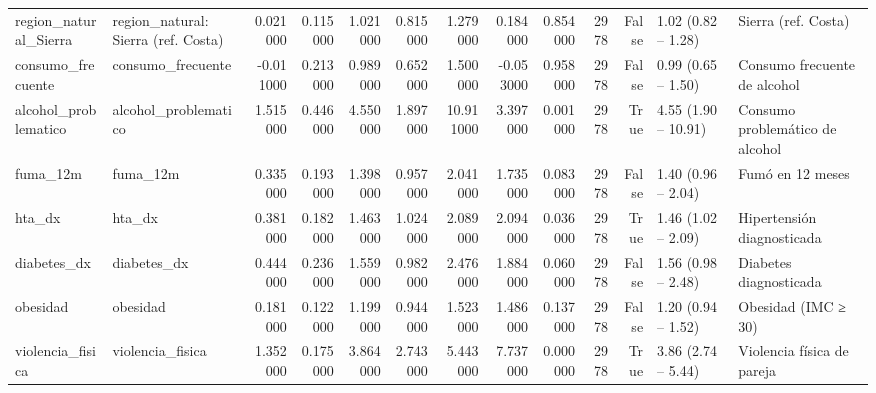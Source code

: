 \begin{table}[htbp]
\begin{tabular}{llrrrrrrrrrll}
region\_natural\_Sierra & region\_natural: Sierra (ref. Costa) & 0.021000 & 0.115000 & 1.021000 & 0.815000 & 1.279000 & 0.184000 & 0.854000 & 2978 & False & 1.02 (0.82 – 1.28) & Sierra (ref. Costa) \\
consumo\_frecuente & consumo\_frecuente & -0.011000 & 0.213000 & 0.989000 & 0.652000 & 1.500000 & -0.053000 & 0.958000 & 2978 & False & 0.99 (0.65 – 1.50) & Consumo frecuente de alcohol \\
alcohol\_problematico & alcohol\_problematico & 1.515000 & 0.446000 & 4.550000 & 1.897000 & 10.911000 & 3.397000 & 0.001000 & 2978 & True & 4.55 (1.90 – 10.91) & Consumo problemático de alcohol \\
fuma\_12m & fuma\_12m & 0.335000 & 0.193000 & 1.398000 & 0.957000 & 2.041000 & 1.735000 & 0.083000 & 2978 & False & 1.40 (0.96 – 2.04) & Fumó en 12 meses \\
hta\_dx & hta\_dx & 0.381000 & 0.182000 & 1.463000 & 1.024000 & 2.089000 & 2.094000 & 0.036000 & 2978 & True & 1.46 (1.02 – 2.09) & Hipertensión diagnosticada \\
diabetes\_dx & diabetes\_dx & 0.444000 & 0.236000 & 1.559000 & 0.982000 & 2.476000 & 1.884000 & 0.060000 & 2978 & False & 1.56 (0.98 – 2.48) & Diabetes diagnosticada \\
obesidad & obesidad & 0.181000 & 0.122000 & 1.199000 & 0.944000 & 1.523000 & 1.486000 & 0.137000 & 2978 & False & 1.20 (0.94 – 1.52) & Obesidad (IMC ≥ 30) \\
violencia\_fisica & violencia\_fisica & 1.352000 & 0.175000 & 3.864000 & 2.743000 & 5.443000 & 7.737000 & 0.000000 & 2978 & True & 3.86 (2.74 – 5.44) & Violencia física de pareja \\
\bottomrule
\end{tabular}
\end{table}
